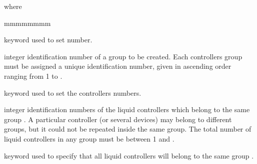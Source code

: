 \noindent where
\begin{ListeDeDescription}{mmmmmmmm}

\item[\moc{GROUP-ID}] keyword used to set  number.

\item[\dusa{igrp}] integer identification number of a group to be created.
Each controllers group must be assigned a unique identification number,
given in ascending order ranging from 1 to .

\item[\moc{LZC-ID}] keyword used to set the controllers  numbers.

\item[\dusa{id}] integer identification numbers of the liquid controllers which
belong to the same group . A particular controller (or several devices)
may belong to different groups, but it could not be repeated inside the same
group. The total number of liquid controllers in any group must be between
1 and .

\item[\moc{ALL}] keyword used to specify that all liquid controllers
will belong to the same group .

\end{ListeDeDescription}
\clearpage
